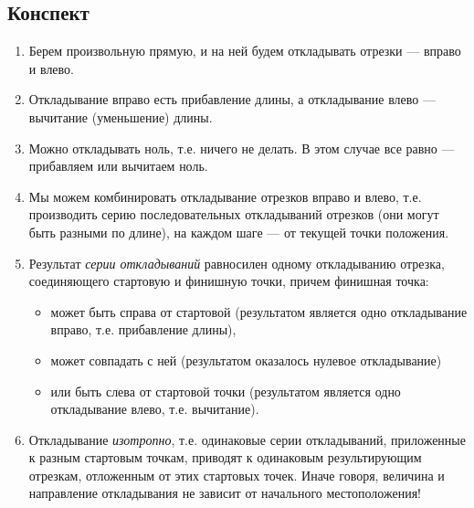 \subsection*{Конспект}
\begin{enumerate}\setlength{\itemsep}{1pt}
\item Берем произвольную прямую, и на ней будем откладывать отрезки --- вправо и влево.
\item Откладывание вправо есть прибавление длины, а откладывание влево --- вычитание (уменьшение) длины.
\item Можно откладывать ноль, т.е. ничего не делать. В этом случае все равно --- прибавляем или вычитаем ноль.
\item Мы можем комбинировать откладывание отрезков вправо и влево, т.е. производить серию последовательных откладываний отрезков (они могут быть разными по длине), на каждом шаге --- от текущей точки положения.
\item Результат \textit{серии откладываний} равносилен одному откладыванию отрезка, соединяющего стартовую и финишную точки, причем финишная точка:
\begin{itemize}
\item может быть справа от стартовой (результатом является одно откладывание вправо, т.е. прибавление длины),
\item может совпадать с ней (результатом оказалось нулевое откладывание)
\item или быть слева от стартовой точки (результатом является одно откладывание влево, т.е. вычитание).
\end{itemize}
\item Откладывание \textit{изотропно}, т.е. одинаковые серии откладываний, приложенные к разным стартовым точкам, приводят к одинаковым результирующим отрезкам, отложенным от этих стартовых точек. Иначе говоря, величина и направление откладывания не зависит от начального местоположения!
\end{enumerate}
